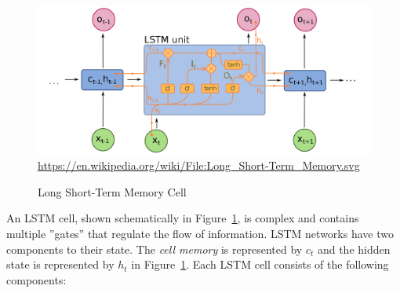 \begin{figure}
\centering

\includegraphics[width=.9\textwidth]{lstm_wikimedia2.png}
\scriptsize \url{https://en.wikipedia.org/wiki/File:Long_Short-Term_Memory.svg} \normalsize
\caption{Long Short-Term Memory Cell}
\label{fig:lstm}
\end{figure}

An LSTM cell, shown schematically in Figure~\ref{fig:lstm}, is complex and contains multiple ''gates'' that regulate the flow of information. LSTM networks have two components to their state. The \emph{cell memory} is represented by $c_t$ and the hidden state is represented by $h_t$ in Figure~\ref{fig:lstm}. Each LSTM cell consists of the following components:

